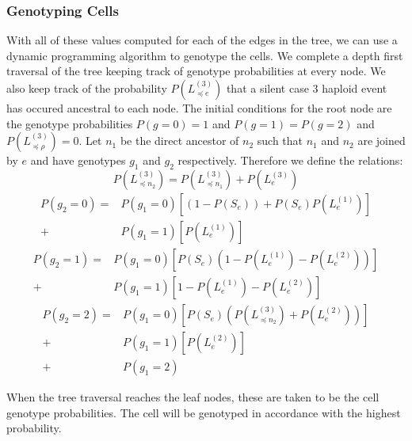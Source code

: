 \documentclass[../../main.tex]{subfiles}
\begin{document}


\subsubsection*{Genotyping Cells}
With all of these values computed for each of the edges in the tree, we can use a dynamic programming algorithm to genotype the cells. We complete a depth first traversal of the tree keeping track of genotype probabilities at every node. We also keep track of the probability $P(L_{\preceq e}^{(3)})$ that a silent case 3 haploid event has occured ancestral to each node. The initial conditions for the root node are the genotype probabilities $P(g=0)=1$ and $P(g=1)=P(g=2)$ and $P(L_{\preceq \rho}^{(3)}) = 0$. Let $n_1$ be the direct ancestor of $n_2$ such that $n_1$ and $n_2$ are joined by $e$ and have genotypes $g_1$ and $g_2$ respectively. Therefore we define the relations:
\begin{equation*}
P(L^{(3)}_{\preceq n_2}) = P(L^{(3)}_{\preceq n_1}) +P(L^{(3)}_e)
\end{equation*}
\begin{align*}
P(g_2 = 0) = &P(g_1=0)\left[(1-P(S_e))+P(S_e)P(L^{(1)}_e)\right]\\
+ &P(g_1 = 1)\left[P(L^{(1)}_e)\right]
\end{align*}
\begin{align*}
P(g_2 = 1) = &P(g_1=0)\left[P(S_e)(1-P(L^{(1)}_e)-P(L^{(2)}_e))\right]\\
+ &P(g_1 = 1)\left[1-P(L^{(1)}_e)-P(L^{(2)}_e)\right]
\end{align*}
\begin{align*}
P(g_2=2) = &P(g_1=0)\left[P(S_e)(P(L^{(3)}_{\preceq n_2}) + P(L^{(2)}_e))\right]\\
+ &P(g_1=1)\left[P(L^{(2)}_e)\right]\\
+ &P(g_1=2)
\end{align*}

When the tree traversal reaches the leaf nodes, these are taken to be the cell genotype probabilities. The cell will be genotyped in accordance with the highest probability.
\end{document}
